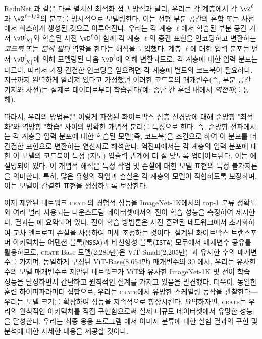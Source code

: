 \documentclass[../../book-main_ko.tex]{subfiles}
\begin{document}
\begin{remark}\label{sub:forward_backward}
    ReduNet \cite{chan2021redunet}과 같은 다른 펼쳐진 최적화 접근 방식과 달리, 우리는 각 계층에서 각 $\vZ^\ell$과 $\vZ^{\ell + 1/2}$의 분포를 명시적으로 모델링한다. 이는 선형 부분 공간의 혼합 또는 사전에서 희소하게 생성된 것으로 이루어진다. 우리는 각 계층 \(\ell\)에서 학습된 부분 공간 기저 \(\vU_{[K]}^{\ell}\)와 학습된 사전 \(\vD^{\ell}\)이 함께 각 계층 \(\ell\)의 중간 표현을 인코딩하고 변환하는 \textit{코드북} 또는 \textit{분석 필터} 역할을 한다는 해석을 도입했다. 계층 \(\ell\)에 대한 입력 분포는 먼저 \(\vU_{[K]}^{\ell}\)에 의해 모델링된 다음 \(\vD^{\ell}\)에 의해 변환되므로, 각 계층에 대한 입력 분포는 다르다. 따라서 가장 간결한 인코딩을 얻으려면 각 계층에 별도의 코드북이 필요하다. 지금까지 완벽하게 알려져 있다고 가정했던 이러한 코드북의 매개변수(즉, 부분 공간 기저와 사전)는 실제로 데이터로부터 학습된다(예: 종단 간 훈련 내에서 \textit{역전파}를 통해).
    
    따라서, 우리의 방법론은 이렇게 파생된 화이트박스 심층 신경망에 대해 순방향 "최적화"와 역방향 "학습" 사이의 명확한 개념적 분리를 특징으로 한다. 즉, 순방향 전파에서는 각 계층을 입력 분포에 대한 학습된 모델(즉, 코드북)을 조건으로 하여 이 분포를 더 간결한 표현으로 변환하는 연산자로 해석한다. 역전파에서는 각 계층의 입력 분포에 대한 이 모델의 코드북이 특정 (지도) 입출력 관계에 더 잘 맞도록 업데이트된다. 이는 에 설명되어 있다. 이 개념적 해석은 특정 작업 및 손실에 대한 모델 표현의 특정 불가지론을 의미한다. 특히, 많은 유형의 작업과 손실은 각 계층의 모델이 적합하도록 보장하며, 이는 모델이 간결한 표현을 생성하도록 보장한다.
\end{remark}






이제 제안된 네트워크 \textsc{crate}의 경험적 성능을 ImageNet-1K에서의 top-1 분류 정확도와 여러 널리 사용되는 다운스트림 데이터셋에서의 전이 학습 성능을 측정하여 제시한다.
결과는 에 요약되어 있다. 전이 학습 방법론은 사전 훈련된 네트워크에서 초기화하여 교차 엔트로피 손실을 사용하여 미세 조정하는 것이다.
설계된 화이트박스 트랜스포머 아키텍처는 어텐션 블록(\texttt{MSSA})과 비선형성 블록(\texttt{ISTA}) 모두에서 매개변수 공유를 활용하므로, \textsc{crate}{-Base} 모델(2,280만)은
ViT-Small(2,205만)~\cite{dosovitskiy2020image}과 유사한 수의 매개변수를 가지며, 동일하게 구성된 ViT-Base(8,654만) 매개변수의 30%
에서, 우리는 유사한 수의 모델 매개변수로 제안된 네트워크가 ViT와 유사한 ImageNet-1K 및 전이 학습 성능을 달성하면서 간단하고 원칙적인 설계를 가지고 있음을 발견했다. 더욱이, 동일한 훈련 하이퍼파라미터 집합으로, 우리는 \textsc{crate}에서 유망한 스케일링 동작을 관찰한다---우리는 모델 크기를 확장하여 성능을 지속적으로 향상시킨다. 요약하자면, \textsc{crate}는 우리의 원칙적인 아키텍처를 직접 구현함으로써 실제 대규모 데이터셋에서 유망한 성능을 달성한다. 우리는 최종 응용 프로그램 에서 이미지 분류에 대한 실험 결과의 구현 및 분석에 대한 자세한 내용을 제공할 것이다.
\end{document}
